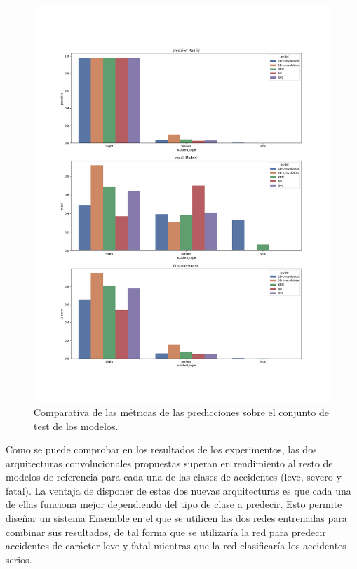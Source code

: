     \begin{figure}[H]
        \centering
        \includegraphics[width=13cm]{archivos/5.Resultados/ComparativaTest}
        \caption{Comparativa de las métricas de las predicciones sobre el conjunto de test de los modelos.}
        \label{ResultsTestImage}
     \end{figure}

    Como se puede comprobar en los resultados de los experimentos, las dos arquitecturas convolucionales propuestas superan en rendimiento al resto de modelos de referencia para cada una de las clases de accidentes (leve, severo y fatal). La ventaja de disponer de estas dos nuevas arquitecturas es que cada una de ellas funciona mejor dependiendo del tipo de clase a predecir. Esto permite diseñar un sistema Ensemble en el que se utilicen las dos redes entrenadas para combinar sus resultados, de tal forma que se utilizaría la red  para predecir accidentes de carácter leve y fatal mientras que la red  clasificaría los accidentes serios.
